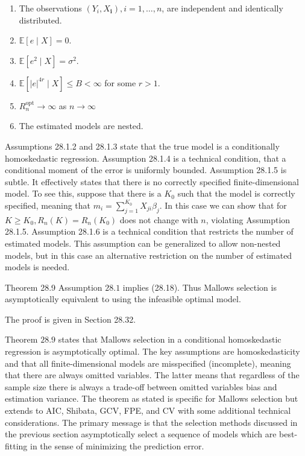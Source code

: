 \documentclass[10pt]{article}
\begin{document}
\begin{enumerate}
  \item The observations $\left(Y_{i}, X_{\boldsymbol{i}}\right), i=1, \ldots, n$, are independent and identically distributed.

  \item $\mathbb{E}[e \mid X]=0$.

  \item $\mathbb{E}\left[e^{2} \mid X\right]=\sigma^{2}$.

  \item $\mathbb{E}\left[|e|^{4 r} \mid X\right] \leq B<\infty$ for some $r>1$.

  \item $R_{n}^{\mathrm{opt}} \rightarrow \infty$ as $n \rightarrow \infty$

  \item The estimated models are nested.

\end{enumerate}
Assumptions 28.1.2 and 28.1.3 state that the true model is a conditionally homoskedastic regression. Assumption 28.1.4 is a technical condition, that a conditional moment of the error is uniformly bounded. Assumption 28.1.5 is subtle. It effectively states that there is no correctly specified finite-dimensional model. To see this, suppose that there is a $K_{0}$ such that the model is correctly specified, meaning that $m_{i}=\sum_{j=1}^{K_{0}} X_{j i} \beta_{j}$. In this case we can show that for $K \geq K_{0}, R_{n}(K)=R_{n}\left(K_{0}\right)$ does not change with $n$, violating Assumption 28.1.5. Assumption 28.1.6 is a technical condition that restricts the number of estimated models. This assumption can be generalized to allow non-nested models, but in this case an alternative restriction on the number of estimated models is needed.

Theorem 28.9 Assumption $28.1$ implies (28.18). Thus Mallows selection is asymptotically equivalent to using the infeasible optimal model.

The proof is given in Section 28.32.

Theorem $28.9$ states that Mallows selection in a conditional homoskedastic regression is asymptotically optimal. The key assumptions are homoskedasticity and that all finite-dimensional models are misspecified (incomplete), meaning that there are always omitted variables. The latter means that regardless of the sample size there is always a trade-off between omitted variables bias and estimation variance. The theorem as stated is specific for Mallows selection but extends to AIC, Shibata, GCV, FPE, and CV with some additional technical considerations. The primary message is that the selection methods discussed in the previous section asymptotically select a sequence of models which are best-fitting in the sense of minimizing the prediction error.
\end{document}
